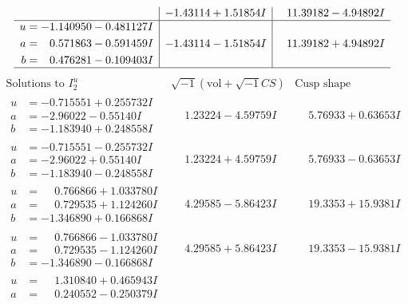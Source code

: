 \documentclass[1p]{elsarticle_modified}
\theoremstyle{definition}
\newcommand{\I}{\sqrt{-1}}
\begin{document}
$$\begin{array}{c|c|c}
 & -1.43114 + 1.51854 I & \phantom{-}11.39182 - 4.94892 I \\ \hline\begin{aligned}
u &= -1.140950 - 0.481127 I \\
a &= \phantom{-}0.571863 - 0.591459 I \\
b &= \phantom{-}0.476281 - 0.109403 I\end{aligned}
 & -1.43114 - 1.51854 I & \phantom{-}11.39182 + 4.94892 I\\
 \hline 
 \end{array}$$\newpage$$\begin{array}{c|c|c}  
\text{Solutions to }I^u_{2}& \I (\text{vol} + \sqrt{-1}CS) & \text{Cusp shape}\\
 \hline 
\begin{aligned}
u &= -0.715551 + 0.255732 I \\
a &= -2.96022 - 0.55140 I \\
b &= -1.183940 + 0.248558 I\end{aligned}
 & \phantom{-}1.23224 - 4.59759 I & \phantom{-}5.76933 + 0.63653 I \\ \hline\begin{aligned}
u &= -0.715551 - 0.255732 I \\
a &= -2.96022 + 0.55140 I \\
b &= -1.183940 - 0.248558 I\end{aligned}
 & \phantom{-}1.23224 + 4.59759 I & \phantom{-}5.76933 - 0.63653 I \\ \hline\begin{aligned}
u &= \phantom{-}0.766866 + 1.033780 I \\
a &= \phantom{-}0.729535 + 1.124260 I \\
b &= -1.346890 + 0.166868 I\end{aligned}
 & \phantom{-}4.29585 - 5.86423 I & \phantom{-}19.3353 + 15.9381 I \\ \hline\begin{aligned}
u &= \phantom{-}0.766866 - 1.033780 I \\
a &= \phantom{-}0.729535 - 1.124260 I \\
b &= -1.346890 - 0.166868 I\end{aligned}
 & \phantom{-}4.29585 + 5.86423 I & \phantom{-}19.3353 - 15.9381 I \\ \hline\begin{aligned}
u &= \phantom{-}1.310840 + 0.465943 I \\
a &= \phantom{-}0.240552 - 0.250379 I \\

\end{aligned}
\end{array}$$
\end{document}
